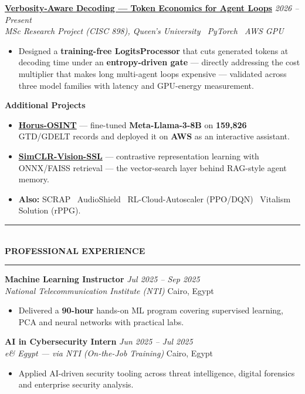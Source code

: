 \documentclass[10pt, a4paper]{article}
\newcommand{\cvsection}[1]{%
  \vspace{3pt}%
  {\color{navy}\rule{\linewidth}{1.1pt}}\\[0.5pt]%
  {\color{navy}\bfseries\fontsize{9.5}{11}\selectfont\uppercase{#1}}\\[-4pt]%
  {\color{teal}\rule{\linewidth}{0.6pt}}%
  \vspace{2pt}%
}
\newcommand{\cventry}[4]{%
  \vspace{2.5pt}%
  \textbf{\color{darkgray}#1} \hfill {\color{midgray}\textit{#3}}\\[-1.5pt]%
  {\color{teal}\textit{#2}} \hfill {\color{midgray}#4}%
}
\newcommand{\cvproject}[3]{%
  \vspace{2.5pt}%
  {\bfseries\color{navy}#1} \hfill {\color{midgray}\textit{#3}}\\[-1.5pt]%
  {\color{teal}\textit{#2}}%
}
\newcommand{\cvmini}[2]{\item {\bfseries\color{navy}#1} --- #2}
\newenvironment{cvitems}{%
  \begin{itemize}[leftmargin=11pt, itemsep=0.5pt, parsep=0pt, topsep=1pt,
                  label={\textcolor{teal}{$\bullet$}}]
}{%
  \end{itemize}%
}
\begin{document}
\cvproject{\href{https://github.com/MahmoudAlyosify/minimal-lm}{Verbosity-Aware Decoding --- Token Economics for Agent Loops}}
          {MSc Research Project (CISC 898), Queen's University \textperiodcentered\ PyTorch \textperiodcentered\ AWS GPU}
          {2026 -- Present}
\begin{cvitems}
  \item Designed a \textbf{training-free LogitsProcessor} that cuts generated tokens at decoding time under an \textbf{entropy-driven gate} --- directly addressing the cost multiplier that makes long multi-agent loops expensive --- validated across three model families with latency and GPU-energy measurement.
\end{cvitems}

\vspace{3pt}
{\bfseries\color{navy}Additional Projects}
\begin{cvitems}
  \cvmini{\href{https://github.com/MahmoudAlyosify/Horus-OSINT}{Horus-OSINT}}{fine-tuned \textbf{Meta-Llama-3-8B} on \textbf{159,826} GTD/GDELT records and deployed it on \textbf{AWS} as an interactive assistant.}
  \cvmini{\href{https://github.com/MahmoudAlyosify/SimCLR-Vision-SSL}{SimCLR-Vision-SSL}}{contrastive representation learning with ONNX/FAISS retrieval --- the vector-search layer behind RAG-style agent memory.}
  \item \textbf{Also:} SCRAP \textperiodcentered\ AudioShield \textperiodcentered\ RL-Cloud-Autoscaler (PPO/DQN) \textperiodcentered\ Vitalism Solution (rPPG).
\end{cvitems}

\cvsection{Professional Experience}

\cventry{Machine Learning Instructor}{National Telecommunication Institute (NTI)}
        {Jul 2025 -- Sep 2025}{Cairo, Egypt}
\begin{cvitems}
  \item Delivered a \textbf{90-hour} hands-on ML program covering supervised learning, PCA and neural networks with practical labs.
\end{cvitems}

\cventry{AI in Cybersecurity Intern}{e\& Egypt --- via NTI (On-the-Job Training)}
        {Jun 2025 -- Jul 2025}{Cairo, Egypt}
\begin{cvitems}
  \item Applied AI-driven security tooling across threat intelligence, digital forensics and enterprise security analysis.
\end{cvitems}
\end{document}
